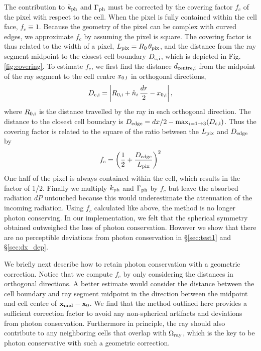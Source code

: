 \documentclass[useAMS,usenatbib]{mn2e}
\begin{document}
The contribution to $k_{\rm ph}$ and $\Gamma_{\rm ph}$ must be
corrected by the covering factor $f_c$ of the pixel with respect to
the cell.  When the pixel is fully contained within the cell face,
$f_c \equiv 1$.  Because the geometry of the pixel can be complex with
curved edges, we approximate $f_c$ by assuming the pixel is square.
The covering factor is thus related to the width of a pixel, $L_{\rm
  pix} = R_0 \, \theta_{\rm pix}$, and the distance from the ray
segment midpoint to the closest cell boundary $D_{\rm c,i}$, which is
depicted in Fig. \ref{fig:covering}.  To estimate $f_c$, we first
find the distance $d_{\rm centre,i}$ from the midpoint of the ray
segment to the cell centre $x_{\rm 0,i}$ in orthogonal directions,
%
\begin{equation}
  \label{eqn:midpoint}
  D_{\rm c,i} = \left| R_{\rm 0,i} + \hat{n}_i\,\frac{dr}{2} - x_{\rm
      0,i} \right|,
\end{equation}
where $R_{\rm 0,i}$ is the distance travelled by the ray in each
orthogonal direction.  The distance to the closest cell boundary is
$D_{\rm edge} = dx/2 - \max_{i=1 \rightarrow 3} (D_{\rm c,i})$.  Thus
the covering factor is related to the square of the ratio between the
$L_{\rm pix}$ and $D_{\rm edge}$ by
%
\begin{equation}
  \label{eqn:fc}
  f_c = \left( \frac{1}{2} + \frac{D_{\rm edge}}{L_{\rm pix}} \right)^2
\end{equation}
One half of the pixel is always contained within the cell, which
results in the factor of 1/2.  Finally we multiply $k_{\rm ph}$ and
$\Gamma_{\rm ph}$ by $f_c$ but leave the absorbed radiation $dP$
untouched because this would underestimate the attenuation of the
incoming radiation.  Using $f_c$ calculated like above, the method is
no longer photon conserving.  In our implementation, we felt that the
spherical symmetry obtained outweighed the loss of photon
conservation.  However we show that there are no perceptible
deviations from photon conservation in \S\ref{sec:test1} and
\S\ref{sec:dx_dep}.

We briefly next describe how to retain photon conservation with a
geometric correction.  Notice that we compute $f_c$ by only
considering the distances in orthogonal directions.  A better estimate
would consider the distance between the cell boundary and ray segment
midpoint in the direction between the midpoint and cell centre of
$\mathbf{x}_{\rm mid} - \mathbf{x}_0$.  We find that the method
outlined here provides a sufficient correction factor to avoid any
non-spherical artifacts and deviations from photon conservation.
Furthermore in principle, the ray should also contribute to any
neighboring cells that overlap with $\Omega_{\rm ray}$, which is the
key to be photon conservative with such a geometric correction.
\end{document}
